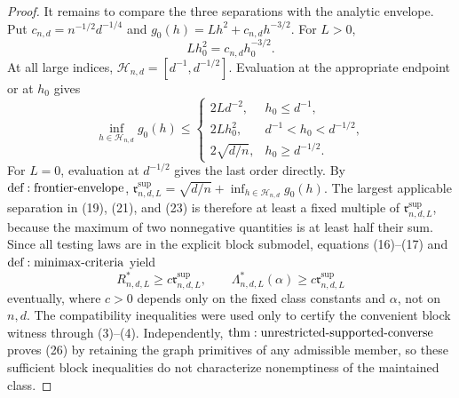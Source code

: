 \documentclass{article}
\begin{document}
\begin{proof}
It remains to compare the three separations with the analytic envelope.  Put \(c_{n,d}=n^{-1/2}d^{-1/4}\) and \(g_0(h)=Lh^2+c_{n,d}h^{-3/2}\).  For \(L>0\),
\[
 Lh_0^2=c_{n,d}h_0^{-3/2}.
\tag{24}
\]
At all large indices, \(\mathcal H_{n,d}=[d^{-1},d^{-1/2}]\).  Evaluation at the appropriate endpoint or at \(h_0\) gives
\[
 \inf_{h\in\mathcal H_{n,d}}g_0(h)
 \leq
 \begin{cases}
 2Ld^{-2},&h_0\leq d^{-1},\\
 2Lh_0^2,&d^{-1}<h_0<d^{-1/2},\\
 2\sqrt{d/n},&h_0\geq d^{-1/2}.
 \end{cases}
\tag{25}
\]
For \(L=0\), evaluation at \(d^{-1/2}\) gives the last order directly.  By \({\rm def:frontier\text{-}envelope}\), \(\mathfrak r^{\mathrm{sup}}_{n,d,L}=\sqrt{d/n}+\inf_{h\in\mathcal H_{n,d}}g_0(h)\).  The largest applicable separation in (19), (21), and (23) is therefore at least a fixed multiple of \(\mathfrak r^{\mathrm{sup}}_{n,d,L}\), because the maximum of two nonnegative quantities is at least half their sum.  Since all testing laws are in the explicit block submodel, equations (16)--(17) and \({\rm def:minimax\text{-}criteria}\) yield
\[
 R^*_{n,d,L}\geq c\mathfrak r^{\mathrm{sup}}_{n,d,L},
 \qquad
 \Lambda^*_{n,d,L}(\alpha)\geq c\mathfrak r^{\mathrm{sup}}_{n,d,L}
\tag{26}
\]
eventually, where \(c>0\) depends only on the fixed class constants and \(\alpha\), not on \(n,d\).  The compatibility inequalities were used only to certify the convenient block witness through (3)--(4).  Independently, \({\rm thm:unrestricted\text{-}supported\text{-}converse}\) proves (26) by retaining the graph primitives of any admissible member, so these sufficient block inequalities do not characterize nonemptiness of the maintained class.
\end{proof}
\end{document}
